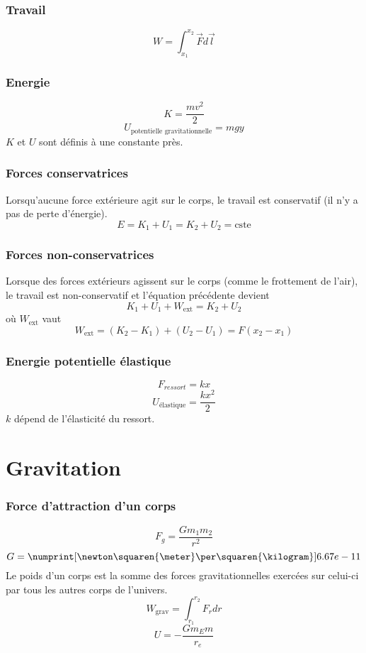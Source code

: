 \section{Travail}
\[ W = \int_{x_1}^{x_2} \vec{F} d\vec{l} \]
\section{Energie}
\[ K = \frac{mv^2}{2} \]
\[ U_{\text{potentielle gravitationnelle}} = mgy \]
$K$ et $U$ sont définis à une constante près.

\section{Forces conservatrices}
Lorsqu'aucune force extérieure agit sur le corps, le travail est conservatif (il n'y a pas de perte d'énergie).
\[ E = K_1 + U_1 = K_2 + U_2 = \mathrm{cste} \]

\section{Forces non-conservatrices}
Lorsque des forces extérieurs agissent sur le corps (comme le frottement de l'air), le travail est non-conservatif et l'équation précédente devient
\[K_1 + U_1 + W_\mathrm{ext} = K_2 + U_2\]
où $W_\mathrm{ext}$ vaut
\[W_\mathrm{ext} = (K_2 - K_1) + (U_2 - U_1) = F(x_2 - x_1)\]

\section{Energie potentielle élastique}
\[ F_{ressort} = kx \]
\[ U_{\text{élastique}} = \frac{kx^2}{2} \]
$k$ dépend de l'élasticité du ressort.

\part{Gravitation}
\section{Force d'attraction d'un corps}
\[ F_g = \frac{Gm_1m_2}{r^2} \]
\[ G = \numprint[\newton\squaren{\meter}\per\squaren{\kilogram}]
{6.67e-11} \]
Le poids d'un corps est la somme des forces gravitationnelles exercées sur celui-ci par tous les autres corps de l'univers.
\[ W_\mathrm{grav} = \int_{r_1}^{r_2}F_r dr \]
\[ U = -\frac{Gm_Em}{r_e} \]

